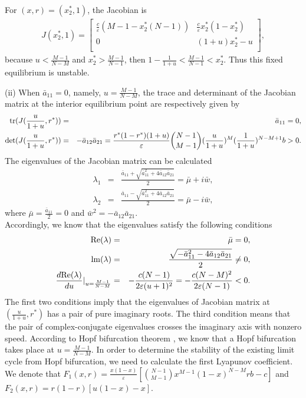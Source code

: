 \documentclass[9pt]{elife}
\begin{document}
\begin{appendixbox}
For $(x, r) = (x_{2}^{*}, 1)$, the Jacobian is
\begin{eqnarray*}
J(x_{2}^{*}, 1) =
  \left[ {\begin{array}{cc}
    \frac{c}{\varepsilon}(M-1-x_{2}^{*}(N-1)) & \frac{c}{\varepsilon}x_{2}^{*}(1-x_{2}^{*}) \\
    0 & (1+u)x_{2}^{*}-u \\
  \end{array} } \right],
\end{eqnarray*}
because $u<\frac{M-1}{N-M}$ and $x_{2}^{*}>\frac{M-1}{N-1}$, then $1-\frac{1}{1+u}<\frac{M-1}{N-1}<x_{2}^{*}$. Thus this fixed equilibrium is unstable.


(ii) When $\bar{a}_{11}=0$, namely, $u=\frac{M-1}{N-M}$, the trace and determinant of the Jacobian matrix at the interior equilibrium point are respectively given by
\begin{eqnarray*}
{\rm tr}(J(\frac{u}{1+u}, r^{*}))&=&\bar{a}_{11}=0,\\
{\rm det} (J(\frac{u}{1+u}, r^{*}))&=&-\bar{a}_{12}\bar{a}_{21}=\frac{r^{*}(1-r^{*})(1+u)}{\varepsilon}\binom{N-1}{M-1}(\frac{u}{1+u})^{M}(\frac{1}{1+u})^{N-M+1}b>0.
\end{eqnarray*}
The eigenvalues of the Jacobian matrix can be calculated
\begin{eqnarray*}
\lambda_{1}&=&\frac{\bar{a}_{11}+\sqrt{\bar{a}_{11}^{2}+4\bar{a}_{12}\bar{a}_{21}}}{2}=\bar{\mu}+i\bar{w},\\
\lambda_{2}&=&\frac{\bar{a}_{11}-\sqrt{\bar{a}_{11}^{2}+4\bar{a}_{12}\bar{a}_{21}}}{2}=\bar{\mu}-i\bar{w},
\end{eqnarray*}
where $\bar{\mu}=\frac{\bar{a}_{11}}{2}=0$ and $\bar{w}^{2}=-\bar{a}_{12}\bar{a}_{21}$.\\

Accordingly, we know that the eigenvalues satisfy the following conditions
\begin{eqnarray*}
{\rm Re} (\lambda)&=&\bar{\mu}=0,\\
{\rm lm} (\lambda)&=&\frac{\sqrt{-\bar{a}_{11}^{2}-4\bar{a}_{12}\bar{a}_{21}}}{2}\neq 0,\\
\frac{d {\rm Re} (\lambda)}{du}|_{u=\frac{M-1}{N-M}}&=&-\frac{c(N-1)}{2\varepsilon(u+1)^{2}}=-\frac{c(N-M)^{2}}{2\varepsilon(N-1)}<0.
\end{eqnarray*}
The first two conditions imply that the eigenvalues of Jacobian matrix at $(\frac{u}{1+u},  r^{*})$ has a pair of pure imaginary roots. The third condition means that the pair of complex-conjugate eigenvalues crosses the imaginary axis with nonzero speed. According to Hopf bifurcation theorem \citep{kuznetsov1998elements}, we know that a Hopf bifurcation takes place at $u=\frac{M-1}{N-M}$. In order to determine the stability of the existing limit cycle from Hopf bifurcation, we need to calculate the first Lyapunov coefficient. We denote that $F_{1}(x, r)=\frac{x(1-x)}{\varepsilon}[\binom{N-1}{M-1}x^{M-1}(1-x)^{N-M}rb-c]$ and $F_{2}(x, r)=r(1-r)[u(1-x)-x]$.


\end{appendixbox}
\end{document}

